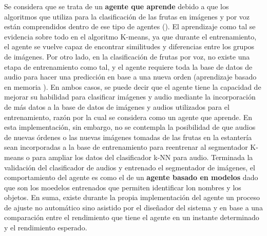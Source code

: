 \documentclass[a4paper, 12pt]{article}
\begin{document}
Se considera que se trata de un \textbf{agente que aprende} debido a que los algoritmos que utiliza para la clasificación de las frutas en imágenes y por voz están comprendidos dentro de ese tipo de agentes (\cite{referencia}). El aprendizaje como tal se evidencia sobre todo en el algoritmo K-means, ya que durante el entrenamiento, el agente se vuelve capaz de encontrar similitudes y diferencias entre los grupos de imágenes. Por otro lado, en la clasificación de frutas por voz, no existe una etapa de entrenamiento como tal, y el agente requiere toda la base de datos de audio para hacer una predicción en base a una nueva orden (aprendizaje basado en memoria \cite{referencia}). En ambos casos, se puede decir que el agente tiene la capacidad de mejorar su habilidad para clasificar imágenes y audio mediante la incorporación de más datos a la base de datos de imágenes y audios utilizados para el entrenamiento, razón por la cual se considera como un agente que aprende. En esta implementación, sin embargo, no se contempla la posibilidad de que audios de nuevas órdenes o las nuevas imágenes tomadas de las frutas en la estantería sean incorporadas a la base de entrenamiento para reentrenar al segmentador K-means o para ampliar los datos del clasificador k-NN para audio. Terminada la validación del clasificador de audios y entrenado el segmentador de imágenes, el comportamiento del agente es como el de un \textbf{agente basado en modelos} dado que son los moedelos entrenados que permiten identificar lon nombres y los objetos. En suma, existe durante la propia implementación del agente un proceso de ajuste no automático sino asistido por el diseñador del sistema y en base a una comparación entre el rendimiento que tiene el agente en un instante determinado y el rendimiento esperado.
\newpage
\end{document}
